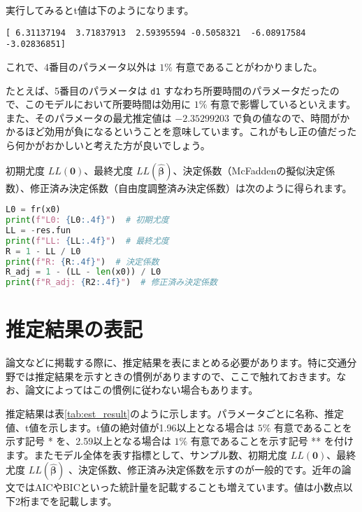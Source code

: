     実行してみるとt値は下のようになります。
    
    \begin{lstlisting}
[ 6.31137194  3.71837913  2.59395594 -0.5058321  -6.08917584 -3.02836851]
\end{lstlisting}
    
    これで、4番目のパラメータ以外は $1\%$ 有意であることがわかりました。
    
    たとえば、5番目のパラメータは \lstinline{d1} すなわち所要時間のパラメータだったので、このモデルにおいて所要時間は効用に $1\%$ 有意で影響しているといえます。また、そのパラメータの最尤推定値は $-2.35299203$ で負の値なので、時間がかかるほど効用が負になるということを意味しています。これがもし正の値だったら何かがおかしいと考えた方が良いでしょう。
    
    初期尤度 $LL(\bm 0)$、最終尤度 $LL(\bm{\hat\beta})$、決定係数（McFaddenの擬似決定係数）、修正済み決定係数（自由度調整済み決定係数）は次のように得られます。
    
    \begin{lstlisting}[language=Python]
L0 = fr(x0)
print(f"L0: {L0:.4f}")  # 初期尤度
LL = -res.fun
print(f"LL: {LL:.4f}")  # 最終尤度
R = 1 - LL / L0
print(f"R: {R:.4f}")  # 決定係数
R_adj = 1 - (LL - len(x0)) / L0
print(f"R_adj: {R2:.4f}")  # 修正済み決定係数
\end{lstlisting}
    
    \section{推定結果の表記}
    \label{sec:est_result}
    
    論文などに掲載する際に、推定結果を表にまとめる必要があります。特に交通分野では推定結果を示すときの慣例がありますので、ここで触れておきます。なお、論文によってはこの慣例に従わない場合もあります。
    
    推定結果は表\ref{tab:est_result}のように示します。パラメータごとに名称、推定値、t値を示します。t値の絶対値が1.96以上となる場合は $5\%$ 有意であることを示す記号 * を、2.59以上となる場合は $1\%$ 有意であることを示す記号 ** を付けます。またモデル全体を表す指標として、サンプル数、初期尤度 $LL(\bm 0)$、最終尤度 $LL(\bm{\hat\beta})$ 、決定係数、修正済み決定係数を示すのが一般的です。近年の論文ではAICやBICといった統計量を記載することも増えています。値は小数点以下2桁までを記載します。

